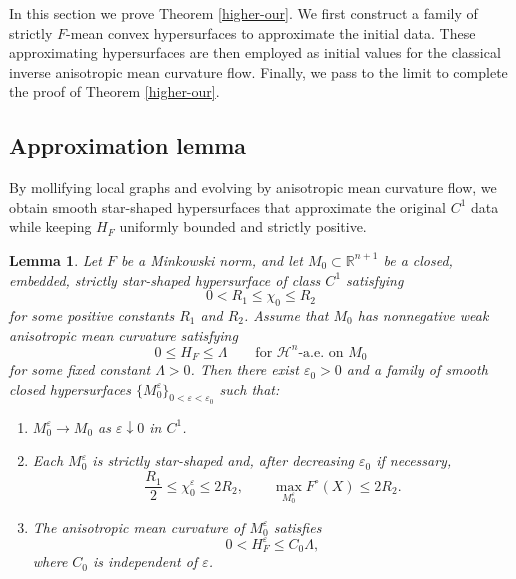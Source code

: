 \documentclass[10pt,a4paper]{amsart}
\newtheorem{lemma}[proposition]{Lemma}
\numberwithin{equation}{section}
\begin{document}
	In this section we prove Theorem \ref{higher-our}. 	We first construct a family of strictly $F$-mean convex hypersurfaces to approximate the initial data. These approximating hypersurfaces are then employed as initial values for the classical inverse anisotropic mean curvature flow. Finally, we pass to the limit to complete the proof of Theorem \ref{higher-our}. 
	
	\subsection{Approximation lemma}\label{sec.4-1}
	By mollifying local graphs and evolving by anisotropic mean curvature flow, we obtain smooth star-shaped hypersurfaces that approximate the original $C^1$ data while keeping $H_F$ uniformly bounded and strictly positive.

\begin{lemma}
\label{lem-approximate}
Let $F$ be a Minkowski norm, and let $M_0\subset\mathbb{R}^{n+1}$ be a closed, embedded, strictly
star-shaped hypersurface of class $C^1$ satisfying
\begin{equation*}
 0<R_1\leq \chi_0\leq R_2
\end{equation*}
for some positive constants $R_1$ and $R_2$. Assume that $M_0$ has nonnegative weak anisotropic mean curvature satisfying
\begin{equation}
\label{eq:initial-H-approx}
 0\leq H_F\leq\Lambda
 \qquad\text{for }\mathcal H^n\text{-a.e. on }M_0
\end{equation}
for some fixed constant $\Lambda>0$. Then there exist
$\varepsilon_0>0$ and a family of smooth closed hypersurfaces
$\{M_0^\varepsilon\}_{0<\varepsilon<\varepsilon_0}$ such that:
\begin{enumerate}
 \item[\textup{(a)}] $  M_0^\varepsilon\longrightarrow M_0$ as $\varepsilon\downarrow0$ in $C^1$.

 \item[\textup{(b)}]
 Each $M_0^\varepsilon$ is strictly star-shaped and, after decreasing
 $\varepsilon_0$ if necessary,
 \begin{equation}
 \label{equ-anibd}
  \frac{R_1}{2}\leq\chi_0^\varepsilon\leq2R_2,
  \qquad
  \max_{M_0^\varepsilon}F^\circ(X)\leq2R_2.
 \end{equation}

 \item[\textup{(c)}]
 The anisotropic mean curvature of $M_0^\varepsilon$ satisfies
 \begin{equation*}
  0<H_F^\varepsilon\leq C_0\Lambda,
 \end{equation*}
 where $C_0$ is independent of $\varepsilon$.
\end{enumerate}
\end{lemma}
\end{document}
